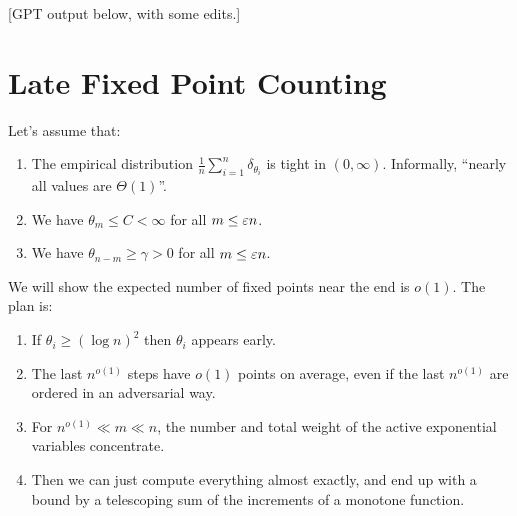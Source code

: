 \documentclass[10pt]{article}
\newcommand{\mscomment}[1]{\textup{\textsf{\color{red}[#1]}}}
\numberwithin{equation}{section}
\begin{document}


\mscomment{GPT output below, with some edits.}

\section{Late Fixed Point Counting}

Let's assume that:
\begin{enumerate}
    \item The empirical distribution $\frac{1}{n}\sum_{i=1}^n \delta_{\theta_i}$ is tight in $(0,\infty)$. Informally, ``nearly all values are $\Theta(1)$''.
    \item 
    We have $\theta_m\leq C<\infty$ for all $m\leq \varepsilon n$.
    \item 
    We have $\theta_{n-m}\geq \gamma>0$ for all  $m\leq \varepsilon n$.
\end{enumerate}

We will show the expected number of fixed points near the end is $o(1)$.
The plan is:

\begin{enumerate}[label=(\alph*)]
    \item If $\theta_i\geq (\log n)^2$ then $\theta_i$ appears early.
    \label{it:1}
    \item 
    The last $n^{o(1)}$ steps have $o(1)$ points on average, even if the last $n^{o(1)}$ are ordered in an adversarial way.
    \item 
    For $n^{o(1)}\ll m\ll n$, the number and total weight of the active exponential variables concentrate.
    \item 
    Then we can just compute everything almost exactly, and end up with a bound by a telescoping sum of the increments of a monotone function.
\end{enumerate}
\end{document}
